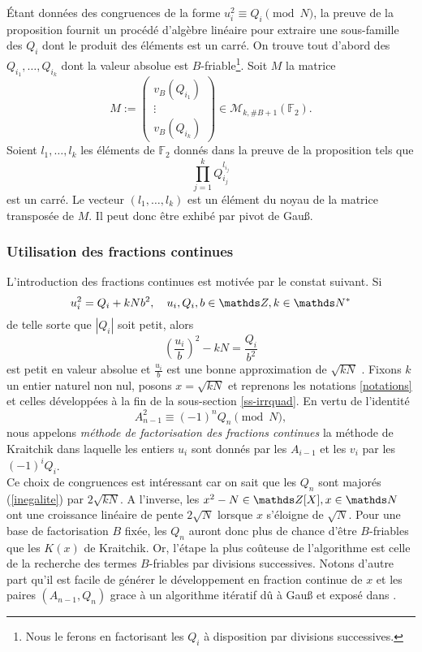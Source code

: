 Étant données des congruences de la forme $u_i^2 \equiv Q_i \pmod{N}$, la
preuve de la proposition fournit un procédé d'algèbre linéaire pour extraire
une sous-famille des $Q_i$ dont le produit des éléments est un carré. On trouve
tout d'abord des $Q_{i_1}, \dots, Q_{i_k}$ dont la valeur absolue est
$B$-friable\footnote{Nous le ferons en factorisant les $Q_i$ à disposition par
divisions successives.}. Soit $M$ la matrice \[M := \begin{pmatrix}
v_B(Q_{i_1}) \\ \vdots \\ v_B(Q_{i_k})\end{pmatrix}\in \mathcal{M}_{k,
\#B+1}(\mathbb{F}_2).\] Soient $l_{1}, \dots, l_{k}$ les éléments de
$\mathbb{F}_2$ donnés dans la preuve de la proposition tels que \[\prod_{j=1}^k
Q_{i_j}^{l_{i_j}}\] est un carré. Le vecteur $(l_1, \dots, l_{k})$ est un
élément du noyau de la matrice transposée de $M$. Il peut donc être exhibé 
par pivot de Gau\ss{}.

\subsubsection{Utilisation des fractions continues}

L'introduction des fractions continues est motivée par le constat suivant. Si
\[u_i^2 = Q_i + kNb^2, \quad u_i, Q_i, b\in \Z, k\in \N^*\] de telle sorte que
$| Q_i |$ soit petit, alors \[\left(\frac{u_i}{b}\right)^2 - kN =
\frac{Q_i}{b^2}\] est petit en valeur absolue et $\frac{u_i}{b}$ est une bonne
approximation de $\sqrt{kN}$ . Fixons $k$ un entier naturel non nul,
posons $x = \sqrt{kN}$ et reprenons les notations \ref{notations} et celles
développées à la fin de la sous-section \ref{ss-irrquad}. En vertu de
l'identité \[A_{n-1}^2 \equiv (-1)^n Q_n \pmod{N},\] nous appelons
\emph{méthode de factorisation des fractions continues} la méthode de Kraitchik
dans laquelle les entiers $u_i$ sont donnés par les $A_{i-1}$ et les $v_i$ par
les $(-1)^i Q_i$. \\

Ce choix de congruences est intéressant car on sait que les $Q_n$ sont majorés
(\ref{inegalite}) par $2\sqrt{kN}$. A l'inverse, les $x^2 - N\in \Z[X], x\in \N$
ont une croissance linéaire de pente $2\sqrt{N}$ lorsque $x$ s'éloigne de 
$\sqrt{N}$. Pour une base de factorisation $B$ fixée, les $Q_n$ auront donc
plus de chance d'être $B$-friables que les $K(x)$ de Kraitchik. Or, l'étape la 
plus coûteuse de l'algorithme est celle de la recherche des termes $B$-friables
par divisions successives. Notons d'autre part qu'il est facile de générer le
développement en fraction continue de $x$ et les paires $(A_{n-1}, Q_n)$ grace
à un algorithme itératif dû à Gau\ss{} et exposé dans . \\

